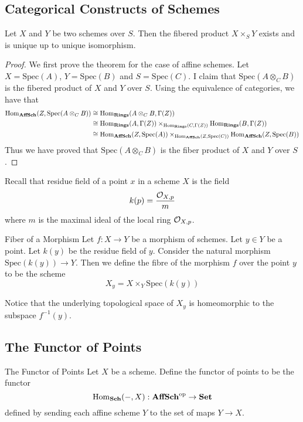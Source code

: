\documentclass[a4paper]{article}
\begin{document}
\subsection{Categorical Constructs of Schemes}
\begin{thm}{}{} Let $X$ and $Y$ be two schemes over $S$. Then the fibered product $X\times_SY$ exists and is unique up to unique isomorphism. \tcbline
\begin{proof}
We first prove the theorem for the case of affine schemes. Let $X=\text{Spec}(A)$, $Y=\text{Spec}(B)$ and $S=\text{Spec}(C)$. I claim that $\text{Spec}(A\otimes_CB)$ is the fibered product of $X$ and $Y$ over $S$. Using the equivalence of categories, we have that 
\begin{align*}
\operatorname{Hom}_\bold{AffSch}(Z,\text{Spec}(A\otimes_CB))&\cong\operatorname{Hom}_\bold{Rings}(A\otimes_CB,\Gamma(Z))\\
&\cong\operatorname{Hom}_\bold{Rings}(A,\Gamma(Z))\times_{\operatorname{Hom}_\bold{Rings}(C,\Gamma(Z))}\operatorname{Hom}_\bold{Rings}(B,\Gamma(Z))\\
&\cong\operatorname{Hom}_\bold{AffSch}(Z,\text{Spec}(A))\times_{\operatorname{Hom}_\bold{AffSch}(Z,\text{Spec}(C))}\operatorname{Hom}_\bold{AffSch}(Z,\text{Spec}(B))
\end{align*}
Thus we have proved that $\text{Spec}(A\otimes_CB)$ is the fiber product of $X$ and $Y$ over $S$. 
\end{proof}
\end{thm}

Recall that residue field of a point $x$ in a scheme $X$ is the field $$k(p)=\frac{\mathcal{O}_{X,p}}{m}$$ where $m$ is the maximal ideal of the local ring $\mathcal{O}_{X,p}$. 

\begin{defn}{Fiber of a Morphism}{} Let $f:X\to Y$ be a morphism of schemes. Let $y\in Y$ be a point. Let $k(y)$ be the residue field of $y$. Consider the natural morphism $\text{Spec}(k(y))\to Y$. Then we define the fibre of the morphism $f$ over the point $y$ to be the scheme $$X_y=X\times_Y\text{Spec}(k(y))$$
\end{defn}

Notice that the underlying topological space of $X_y$ is homeomorphic to the subspace $f^{-1}(y)$. 

\subsection{The Functor of Points}
\begin{defn}{The Functor of Points}{} Let $X$ be a scheme. Define the functor of points to be the functor $$\operatorname{Hom}_\bold{Sch}(-,X):\bold{AffSch}^\text{op}\to\bold{Set}$$ defined by sending each affine scheme $Y$ to the set of maps $Y\to X$. 
\end{defn}
\end{document}

